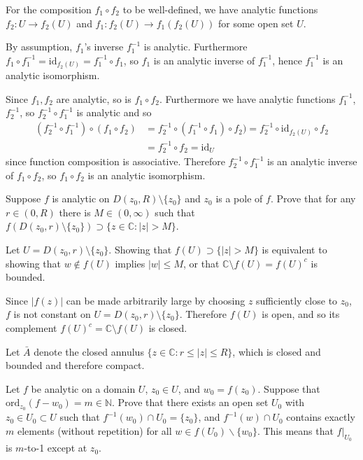 \documentclass{article}
\newcommand\id{\mathrm{id}}
\newcommand\ord{\mathrm{ord}}
\newcounter{Problem}
\newenvironment{Problem}{\begin{Exercise}[name={Problem},
                                          counter={Problem}]}
                        {\end{Exercise}}
\begin{document}
\begin{Answer}
For the composition $f_1 \circ f_2$ to be well-defined,
we have analytic functions $f_2 : U \to f_2(U)$ and
$f_1 : f_2(U) \to f_1(f_2(U))$ for some open set $U$.

By assumption, $f_1$'s inverse $f_1^{-1}$ is analytic.
Furthermore $f_1 \circ f_1^{-1} = \id_{f_2(U)} = f_1^{-1} \circ f_1$,
so $f_1$ is an analytic inverse of $f_1^{-1}$, hence
$f_1^{-1}$ is an analytic isomorphism.

Since $f_1, f_2$ are analytic, so is $f_1 \circ f_2$.
Furthermore we have analytic functions $f_1^{-1}$, $f_2^{-1}$,
so $f_2^{-1} \circ f_1^{-1}$ is analytic and so
\begin{align*}
  (f_2^{-1} \circ f_1^{-1}) \circ (f_1 \circ f_2)
&= f_2^{-1} \circ (f_1^{-1} \circ f_1) \circ f_2)
 = f_2^{-1} \circ \id_{f_2(U)} \circ f_2 \\
&= f_2^{-1} \circ f_2
 = \id_U
\end{align*}
since function composition is associative. Therefore
$f_2^{-1} \circ f_1^{-1}$ is an analytic inverse of $f_1 \circ f_2$,
so $f_1 \circ f_2$ is an analytic isomorphism.
\end{Answer}

\begin{Problem}
Suppose $f$ is analytic on $D(z_0, R) \setminus \{ z_0 \}$
and $z_0$ is a pole of $f$. Prove that for any $r \in (0, R)$
there is $M \in (0, \infty)$ such that
$f(D(z_0, r) \setminus \{z_0\})
 \supset
 \{ z \in \mathbb{C} : |z| > M \}$.
\end{Problem}

\begin{Answer}
Let $U = D(z_0, r) \setminus \{ z_0 \}$.
Showing that
$f(U) \supset \{ |z| > M \}$
is equivalent to showing that
$w \notin f(U)$ implies
$|w| \leq M$, or that
$\mathbb{C} \setminus f(U) = f(U)^c$ is bounded.

Since $|f(z)|$ can be made arbitrarily large by choosing
$z$ sufficiently close to $z_0$, $f$ is not constant on
$U = D(z_0, r) \setminus \{ z_0 \}$. Therefore $f(U)$ is open,
and so its complement $f(U)^c = \mathbb{C} \setminus f(U)$ is closed.

Let $\bar{A}$ denote the closed annulus
$\{ z \in \mathbb{C} : r \leq |z| \leq R \}$, which is closed and
bounded and therefore compact.
\end{Answer}

\begin{Problem}
Let $f$ be analytic on a domain $U$, $z_0 \in U$, and $w_0 = f(z_0)$.
Suppose that $\ord_{z_0} (f - w_0) = m \in \mathbb{N}$. Prove that
there exists an open set $U_0$ with $z_0 \in U_0 \subset U$ such that
$f^{-1}(w_0) \cap U_0 = \{ z_0 \}$, and $f^{-1}(w) \cap U_0$ contains
exactly $m$ elements (without repetition) for all
$w \in f(U_0) \backslash \{ w_0 \}$. This means that $f|_{U_0}$ is
$m$-to-1 except at $z_0$.
\end{Problem}
\end{document}
